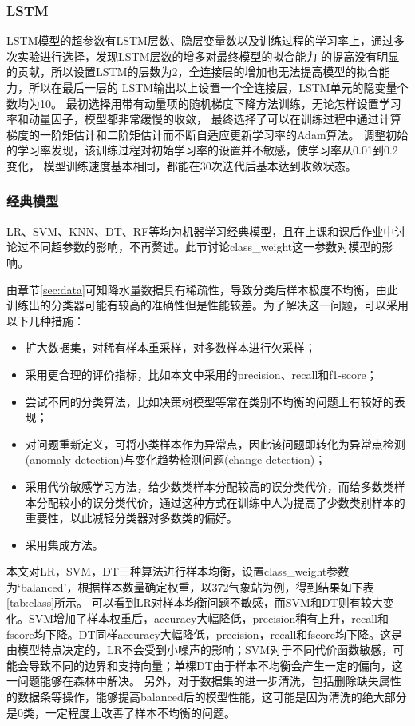 \documentclass[UTF8]{ctexart}
\begin{document}
\subsubsection{LSTM}
LSTM模型的超参数有LSTM层数、隐层变量数以及训练过程的学习率上，通过多次实验进行选择，发现LSTM层数的增多对最终模型的拟合能力
的提高没有明显的贡献，所以设置LSTM的层数为2，全连接层的增加也无法提高模型的拟合能力，所以在最后一层的
LSTM输出以上设置一个全连接层，LSTM单元的隐变量个数均为10。
最初选择用带有动量项的随机梯度下降方法训练，无论怎样设置学习率和动量因子，模型都非常缓慢的收敛，
最终选择了可以在训练过程中通过计算梯度的一阶矩估计和二阶矩估计而不断自适应更新学习率的Adam算法。
调整初始的学习率发现，该训练过程对初始学习率的设置并不敏感，使学习率从0.01到0.2变化，
模型训练速度基本相同，都能在30次迭代后基本达到收敛状态。

\subsubsection{经典模型}
LR、SVM、KNN、DT、RF等均为机器学习经典模型，且在上课和课后作业中讨论过不同超参数的影响，不再赘述。此节讨论class\_weight这一参数对模型的影响。

由章节\ref{sec:data}可知降水量数据具有稀疏性，导致分类后样本极度不均衡，由此训练出的分类器可能有较高的准确性但是性能较差。为了解决这一问题，可以采用以下几种措施：

\begin{itemize}
	\item 扩大数据集，对稀有样本重采样，对多数样本进行欠采样；
	\item 采用更合理的评价指标，比如本文中采用的precision、recall和f1-score；
	\item 尝试不同的分类算法，比如决策树模型等常在类别不均衡的问题上有较好的表现；
	\item 对问题重新定义，可将小类样本作为异常点，因此该问题即转化为异常点检测(anomaly detection)与变化趋势检测问题(change detection)；
	\item 采用代价敏感学习方法，给少数类样本分配较高的误分类代价，而给多数类样本分配较小的误分类代价，通过这种方式在训练中人为提高了少数类别样本的重要性，以此减轻分类器对多数类的偏好。
	\item 采用集成方法。

\end{itemize}

本文对LR，SVM，DT三种算法进行样本均衡，设置class\_weight参数为‘balanced’，根据样本数量确定权重，以372气象站为例，得到结果如下表\ref{tab:class}所示。
可以看到LR对样本均衡问题不敏感，而SVM和DT则有较大变化。SVM增加了样本权重后，accuracy大幅降低，precision稍有上升，recall和fscore均下降。DT同样accuracy大幅降低，precision，recall和fscore均下降。这是由模型特点决定的，LR不会受到小噪声的影响；SVM对于不同代价函数敏感，可能会导致不同的边界和支持向量；单棵DT由于样本不均衡会产生一定的偏向，这一问题能够在森林中解决。
另外，对于数据集的进一步清洗，包括删除缺失属性的数据条等操作，能够提高balanced后的模型性能，这可能是因为清洗的绝大部分是0类，一定程度上改善了样本不均衡的问题。
\end{document}
